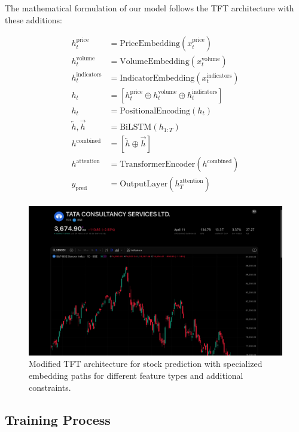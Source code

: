 \documentclass[conference]{IEEEtran}
\begin{document}
The mathematical formulation of our model follows the TFT architecture with these additions:

\begin{equation}
\begin{aligned}
h_{t}^{\text{price}} &= \text{PriceEmbedding}(x_{t}^{\text{price}}) \\
h_{t}^{\text{volume}} &= \text{VolumeEmbedding}(x_{t}^{\text{volume}}) \\
h_{t}^{\text{indicators}} &= \text{IndicatorEmbedding}(x_{t}^{\text{indicators}}) \\
h_{t} &= [h_{t}^{\text{price}} \oplus h_{t}^{\text{volume}} \oplus h_{t}^{\text{indicators}}] \\
h_{t} &= \text{PositionalEncoding}(h_{t}) \\
\overleftarrow{h}, \overrightarrow{h} &= \text{BiLSTM}(h_{1:T}) \\
h^{\text{combined}} &= [\overleftarrow{h} \oplus \overrightarrow{h}] \\
h^{\text{attention}} &= \text{TransformerEncoder}(h^{\text{combined}}) \\
y_{\text{pred}} &= \text{OutputLayer}(h^{\text{attention}}_{T}) \\
\end{aligned}
\end{equation}

\begin{figure}[h]
\centering
\includegraphics[width=0.9\linewidth]{tft_architecture.png}
\caption{Modified TFT architecture for stock prediction with specialized embedding paths for different feature types and additional constraints.}
\label{fig:tft_architecture}
\end{figure}

\subsection{Training Process}
\end{document}
